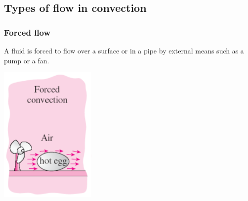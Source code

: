 \documentclass[11pt]{article}
\begin{document}
\subsection{Types of flow in convection}
\label{sec:org8462b78}

\subsubsection{Forced flow}
\label{sec:org6464435}
A fluid is forced to flow over a surface or in a pipe by external means such as a pump or a fan.
\begin{center}
\includegraphics[height=18em]{./images/forced-flow-diagram.png}
\end{center}
\end{document}

